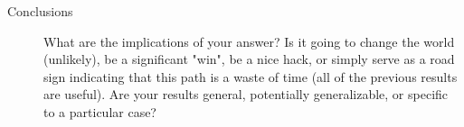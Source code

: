 \begin{description}
  \item[Conclusions] What are the implications of your answer? Is it
  going to change the world (unlikely), be a significant "win", be a nice hack,
  or simply serve as a road sign indicating that this path is a waste of time
  (all of the previous results are useful). Are your results general,
  potentially generalizable, or specific to a particular case?
\end{description}